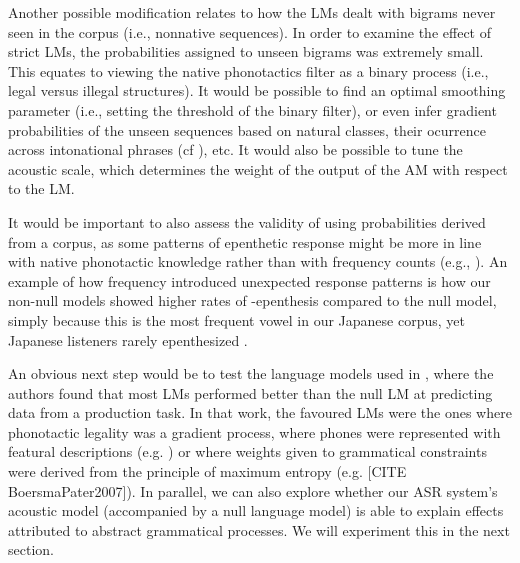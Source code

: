 {Another possible modification relates to how the LMs dealt with bigrams never seen in the corpus (i.e., nonnative sequences). In order to examine the effect of strict LMs, the probabilities assigned to unseen bigrams was extremely small. This equates to viewing the native phonotactics filter as a binary process (i.e., legal versus illegal structures). It would be possible to find an optimal smoothing parameter (i.e., setting the threshold of the binary filter), or even infer gradient probabilities of the unseen sequences based on natural classes, their ocurrence across intonational phrases (cf \cite{durvasula2016}), etc. It would also be possible to tune the acoustic scale, which determines the weight of the output of the AM with respect to the LM.

It would be important to also assess the validity of using probabilities derived from a corpus, as some patterns of epenthetic response might be more in line with native phonotactic knowledge rather than with frequency counts (e.g., \cite{kabak2007}). An example of how frequency introduced unexpected response patterns is how our non-null models showed higher rates of -epenthesis compared to the null model, simply because this is the most frequent vowel in our Japanese corpus, yet Japanese listeners rarely epenthesized \textipa{[a]}.  

An obvious next step would be to test the language models used in \cite{wilson2013}, where the authors found that most LMs performed better than the null LM at predicting data from a production task. In that work, the favoured LMs were the ones where phonotactic legality was a gradient process, where phones were represented with featural descriptions (e.g. {\color{red}\cite{albright2009}}) or where weights given to grammatical constraints were derived from the principle of maximum entropy (e.g. {\color{red}[CITE BoersmaPater2007]}\cite{hayes2008}). In parallel, we can also explore whether our ASR system's acoustic model (accompanied by a null language model) is able to explain effects attributed to abstract grammatical processes. We will experiment this in the next section. 

}
